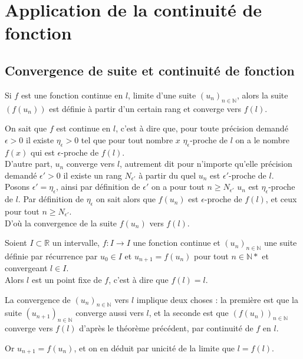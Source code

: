\documentclass[french]{book}
\newcommand{\N}{\mathbb {N}}
\newcommand{\se}{\geq}
\newcommand{\suite}[1][u]{\left( #1_{n} \right)_{n\in\N}}
\begin{document}
\section{Application de la continuité de fonction}
\subsection{Convergence de suite et continuité de fonction}
\begin{thm} 
Si $f$ est une fonction continue en $l$, limite d’une suite $\suite[u]$, alors la suite $(f(u_n))$ est définie à partir d'un certain rang et  converge vers $f(l)$.

\end{thm}

\begin{demo}
On sait que $f$ est continue en $l$, c'est à dire que, pour toute précision demandé $\epsilon >0$ il existe $\eta_{\epsilon}>0$ tel que pour tout nombre $x$ $\eta_{\epsilon}$-proche de $l$ on a le nombre $f(x)$ qui est $\epsilon$-proche de $f(l)$.\\

D'autre part, $u_n$ converge vers $l$, autrement dit pour n'importe qu'elle précision demandé $\epsilon'>0$ il existe un rang $N_{\epsilon'}$ à partir du quel $u_n$ est $\epsilon'$-proche de $l$.\\

Posons $\epsilon'=\eta_{\epsilon}$, ainsi par définition de $\epsilon'$ on a pour tout $n\se  N_{\epsilon'}$ $u_n$ est $\eta_{\epsilon}$-proche de $l$. Par définition de $\eta_{\epsilon}$ on sait alors que  $f(u_n)$ est $\epsilon$-proche de $f(l)$, et ceux  pour tout $n\se  N_{\epsilon'}$.\\

D'où la convergence de la suite $f(u_n)$ vers $f(l)$.
\end{demo}

\begin{prop}
Soient $I \subset \mathbb{R}$ un intervalle, $f : I \longrightarrow I$ une fonction continue et $\suite[u]$ une suite définie par récurrence par $u_0 \in I $ et $u_{n+1}=f(u_n)$ pour tout $n \in \mathbb{N}*$ et convergeant $l \in I$.\\

Alors $l$ est un point fixe de $f$, c'est à dire que $f(l)=l$.

\end{prop}

\begin{demo}
La convergence de $\suite[u]$ vers $l$ implique deux choses : la première est que la suite $(u_{n+1})_{n\in \mathbb{N}}$ converge aussi vers $l$,
 et la seconde est que $(f(u_n))_{n\in \mathbb{N}}$ converge vers $f(l)$ d'après le théorème précédent, par continuité de $f$ en $l$.
 
  Or $u_{n+1} = f(u_n)$, et on en déduit par unicité de la limite que $l = f(l)$.
\end{demo}
\end{document}
